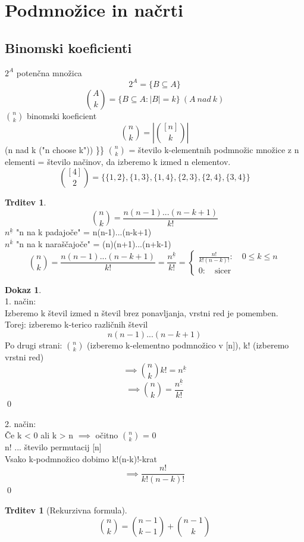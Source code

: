 \documentclass[a4paper,12pt]{article}
\theoremstyle{definition}
\newtheorem{claim}[counter]{Trditev}
\newtheorem{pro}[counter]{Dokaz}
\theoremstyle{remark}
\begin{document}
\section{Podmnožice in načrti}
\subsection{Binomski koeficienti}

$2^A$ potenčna množica
\[2^A = \{B \subseteq A\}\]
\[\binom{A}{k} = \{B \subseteq A: |B| = k\} \ (A \ nad \ k)\]
$\binom{n}{k}$ binomski koeficient
\[\binom{n}{k} = |\binom{[n]}{k}|\]
(n nad k ("n choose k"))
\}\}
$\binom{n}{k}$ = število k-elementnih podmnožic množice z n elementi = število načinov, da izberemo k izmed n elementov.
\[\binom{[4]}{2} = \{\{1, 2\}, \{1, 3\}, \{1, 4\}, \{2, 3\}, \{2, 4\}, \{3, 4\}\}\]

\begin{claim}
\[\binom{n}{k}=\frac{n(n-1)...(n-k+1)}{k!}\]
$n^{\underline{k}}$ "n na k padajoče" = n(n-1)...(n-k+1)\\
$n^{\overline{k}}$ "n na k naraščajoče" = (n)(n+1)...(n+k-1)
\[\binom{n}{k} = \frac{n(n-1)...(n-k+1)}{k!} = \frac{n^{\underline{k}}}{k!} = \begin{cases}\frac{n!}{k!(n-k)!}: \quad 0 \leq k \leq n   \\ 0: \quad \text{sicer} \end{cases}\]
\end{claim}

\begin{pro}\mbox{}\\
1. način:\\
Izberemo k števil izmed n števil brez ponavljanja, vrstni red je pomemben.\\
Torej: izberemo k-terico različnih števil
\[n(n-1)...(n-k+1)\]
Po drugi strani: $\binom{n}{k}$ (izberemo k-elementno podmnožico v [n]), k! (izberemo vrstni red)
\[\implies \binom{n}{k} k! = n^{\underline{k}}\]
\[\implies \binom{n}{k} = \frac{n^{\underline{k}}}{k!}\]
\qed

2. način:\\
Če k < 0 ali k > n $\implies$ očitno $\binom{n}{k}$ = 0\\
n! ... število permutacij [n]\\
Vsako k-podmnožico dobimo k!(n-k)!-krat
\[\implies \frac{n!}{k! (n-k)!}\]
\qed
\end{pro}

\begin{claim}[Rekurzivna formula]
\[\binom{n}{k} = \binom{n-1}{k-1} + \binom{n-1}{k}\]
\end{claim}
\end{document}
